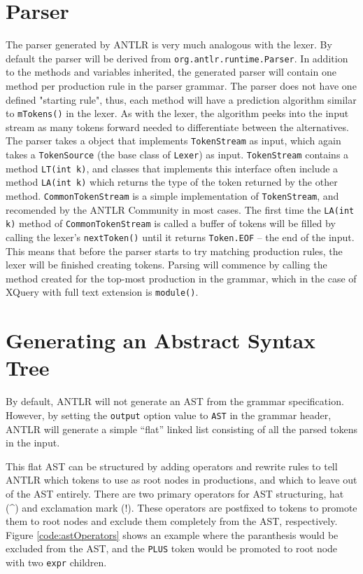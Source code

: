 \section{Parser}
\label{sect:antlr:parser}
The parser generated by ANTLR is very much analogous with the lexer. By default the parser will be derived from \verb!org.antlr.runtime.Parser!. In addition to the methods and variables inherited, the generated parser will contain one method per production rule in the parser grammar. The parser does not have one defined "starting rule", thus, each method will have a prediction algorithm similar to \verb!mTokens()! in the lexer. As with the lexer, the algorithm peeks into the input stream as many tokens forward needed to differentiate between the alternatives. The parser takes a object that implements \verb!TokenStream! as input, which again takes a \verb!TokenSource! (the base class of \verb!Lexer!) as input. \verb!TokenStream! contains a method \verb!LT(int k)!, and classes that implements this interface often include a method \verb!LA(int k)! which returns the type of the token returned by the other method. \verb!CommonTokenStream! is a simple implementation of \verb!TokenStream!, and recomended by the ANTLR Community \cite{antlrorg} in most cases. The first time the \verb!LA(int k)! method of \verb!CommonTokenStream! is called a buffer of tokens will be filled by calling the lexer's \verb!nextToken()! until it returns \verb!Token.EOF! -- the end of the input. This means that before the parser starts to try matching production rules, the lexer will be finished creating tokens. Parsing will commence by calling the method created for the top-most production in the grammar, which in the case of XQuery with full text extension is \verb!module()!.

\section{Generating an Abstract Syntax Tree}
\label{sect:antlr:ast}
By default, ANTLR will not generate an AST from the grammar specification.
However, by setting the \verb!output! option value to \verb!AST! in the grammar
header, ANTLR will generate a simple ``flat'' linked list consisting of all the
parsed tokens in the input. 

This flat AST can be structured by adding operators and rewrite rules to tell
ANTLR which tokens to use as root nodes in productions, and which to leave out
of the AST entirely. There are two primary operators for AST structuring, hat
(\^{}) and exclamation mark (!). These operators are postfixed to tokens to
promote them to root nodes and exclude them completely from the AST,
respectively. Figure \ref{code:astOperators} shows an example where the
paranthesis would be excluded from the AST, and the \verb!PLUS! token
would be promoted to root node with two \verb!expr! children.

